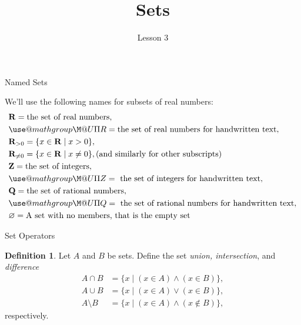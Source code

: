 \documentclass[fleqn]{beamer}
\subtitle{Lesson 3}
\title{\textbf{Sets}}
\date{}
\makeatletter
\newcommand{\reals}{\mathbf{R}}
\newcommand{\integers}{\mathbf{Z}}
\theoremstyle{definition}
\newtheorem{mydef}{Definition}
\def\amsbb{\use@mathgroup \M@U \symAMSb}
\makeatother
\begin{document}
\frame{\titlepage}


\begin{frame}{Named Sets}

We'll use the following names for subsets of real numbers:
\begin{align*}
&\reals = \mbox{the set of real numbers}, \\
& \amsbb{R} =  \mbox{the set of real numbers for handwritten text}, \\
&\reals_{> 0} = \{x \in \reals  \mid  x > 0\}, \\
&\reals_{\neq 0}  =  \{x \in \reals  \mid   x \neq 0\},  \mbox{(and similarly for other subscripts)} \\
&\integers = \mbox{the set of integers}, \\
& \amsbb{Z} = \mbox{ the set of integers for handwritten text}, \\
&\mathbf{Q} = \mbox{the set of rational numbers}, \\
& \amsbb{Q} = \mbox{ the set of rational numbers for handwritten text}, \\
&\varnothing = \mbox{A set with no members, that is the empty set}
\end{align*}

\end{frame}


\begin{frame}{Set Operators}

\begin{mydef}
Let \(A\) and \(B\) be sets. Define the set \emph{union, intersection}, and \emph{difference}
\begin{align*}
   A \cap B &= \{x  \mid  (x \in A)\land (x \in B) \}, \\
   A \cup B &= \{x  \mid (x \in A) \lor (x \in B) \}, \\
   A \setminus B &= \{x  \mid  (x \in A) \land (x \notin B) \},
\end{align*}
respectively.
\end{mydef}
\end{frame}
\end{document}
